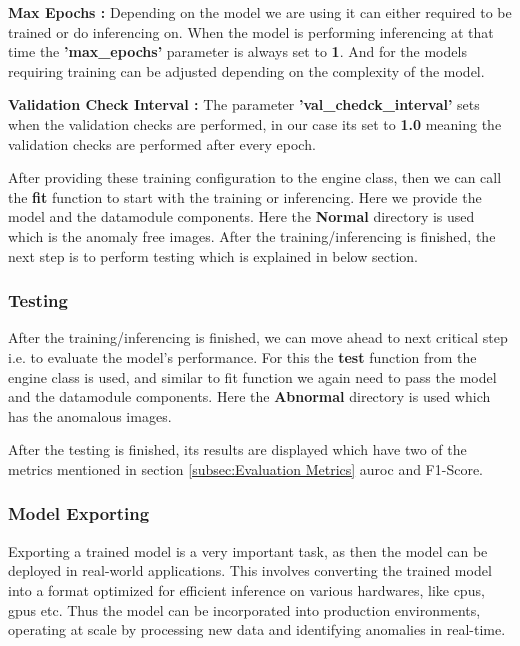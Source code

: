\textbf{Max Epochs :} Depending on the model we are using it can either required to be trained or do inferencing on. When the model is performing inferencing at that time the \textbf{'max\_epochs'} parameter is always set to \textbf{1}. And for the models requiring training can be adjusted depending on the complexity of the model.%

\textbf{Validation Check Interval :} The parameter \textbf{'val\_chedck\_interval'} sets when the validation checks are performed, in our case its set to \textbf{1.0} meaning the validation checks are performed after every epoch.

After providing these training configuration to the engine class, then we can call the \textbf{fit} function to start with the training or inferencing. Here we provide the model and the datamodule components. Here the \textbf{Normal} directory is used which is the anomaly free images. After the training/inferencing is finished, the next step is to perform testing which is explained in below section.

\subsubsection{Testing}

After the training/inferencing is finished, we can move ahead to next critical step i.e. to evaluate the model's performance. For this the \textbf{test} function from the engine class is used, and similar to fit function we again need to pass the model and the datamodule components. Here the \textbf{Abnormal} directory is used which has the anomalous images. 

After the testing is finished, its results are displayed which have two of the metrics mentioned in section \ref{subsec:Evaluation Metrics} \gls{auroc} and F1-Score.

\subsubsection{Model Exporting}
\label{subsec:Model Exporting}

Exporting a trained model is a very important task, as then the model can be deployed in real-world applications. This involves converting the trained model into a format optimized for efficient inference on various hardwares, like \glspl{cpu}, \glspl{gpu} etc. Thus the model can be incorporated into production environments, operating at scale by processing new data and identifying anomalies in real-time.

